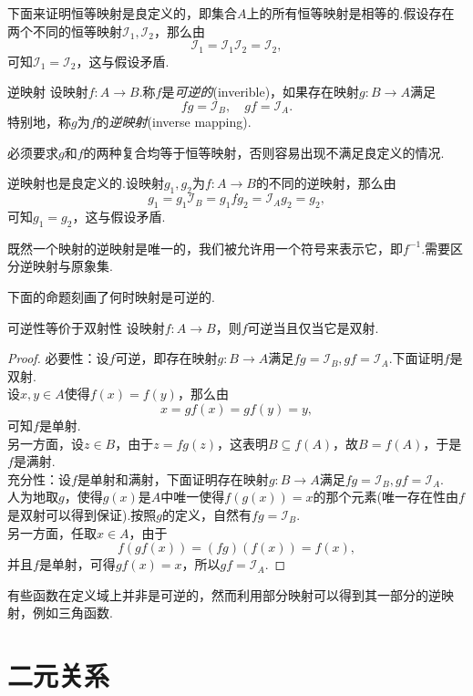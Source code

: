 下面来证明恒等映射是良定义的，即集合$A$上的所有恒等映射是相等的.假设存在两个不同的恒等映射$\mathcal{I}_1,\mathcal{I}_2$，那么由$$\mathcal{I}_1 = \mathcal{I}_1 \mathcal{I}_2 = \mathcal{I}_2,$$
可知$\mathcal{I}_1 = \mathcal{I}_2$，这与假设矛盾.

\begin{definition}{逆映射}
	设映射$f:A \to B$.称$f$是\textit{可逆的}(inverible)，如果存在映射$g:B \to A$满足$$fg=\mathcal{I}_B,\quad gf=\mathcal{I}_A.$$
	特别地，称$g$为$f$的\textit{逆映射}(inverse mapping).
\end{definition}
\begin{remark}
	必须要求$g$和$f$的两种复合均等于恒等映射，否则容易出现不满足良定义的情况.
\end{remark}

逆映射也是良定义的.设映射$g_1,g_2$为$f:A \to B$的不同的逆映射，那么由$$g_1 = g_1\mathcal{I}_B = g_1fg_2 = \mathcal{I}_Ag_2 = g_2,$$
可知$g_1=g_2$，这与假设矛盾.

既然一个映射的逆映射是唯一的，我们被允许用一个符号来表示它，即$f^{-1}$.需要区分逆映射与原象集.

下面的命题刻画了何时映射是可逆的.

\begin{proposition}{可逆性等价于双射性}
	设映射$f:A \to B$，则$f$可逆当且仅当它是双射.
\end{proposition}
\begin{proof}
	必要性：设$f$可逆，即存在映射$g:B \to A$满足$fg=\mathcal{I}_B,gf=\mathcal{I}_A$.下面证明$f$是双射. \\
	设$x,y \in A$使得$f(x)=f(y)$，那么由$$x=gf(x)=gf(y)=y,$$可知$f$是单射. \\
	另一方面，设$z \in B$，由于$z=fg(z)$，这表明$B \subseteq f(A)$，故$B = f(A)$，于是$f$是满射. \\
	充分性：设$f$是单射和满射，下面证明存在映射$g:B \to A$满足$fg=\mathcal{I}_B,gf=\mathcal{I}_A$. \\
	人为地取$g$，使得$g(x)$是$A$中唯一使得$f(g(x))=x$的那个元素(唯一存在性由$f$是双射可以得到保证).按照$g$的定义，自然有$fg=\mathcal{I}_B$. \\
	另一方面，任取$x \in A$，由于$$f(gf(x)) = (fg)(f(x)) = f(x),$$并且$f$是单射，可得$gf(x)=x$，所以$gf=\mathcal{I}_A$.
\end{proof}

有些函数在定义域上并非是可逆的，然而利用部分映射可以得到其一部分的逆映射，例如三角函数.

\section{二元关系}

